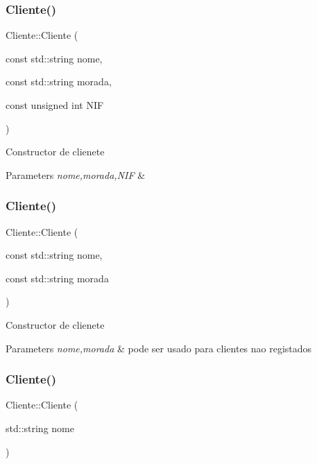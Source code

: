 \subsubsection{\texorpdfstring{Cliente()}{Cliente()}\hspace{0.1cm}{\footnotesize\ttfamily [1/3]}}
{\footnotesize\ttfamily Cliente\+::\+Cliente (\begin{DoxyParamCaption}\item[{const std\+::string}]{nome,  }\item[{const std\+::string}]{morada,  }\item[{const unsigned int}]{N\+IF }\end{DoxyParamCaption})}

Constructor de clienete 
\begin{DoxyParams}{Parameters}
{\em nome,morada,N\+IF} & \\
\hline
\end{DoxyParams}
\hypertarget{class_cliente_a030699a841488d4b3dfbedf75834e002}{}\label{class_cliente_a030699a841488d4b3dfbedf75834e002} 
\subsubsection{\texorpdfstring{Cliente()}{Cliente()}\hspace{0.1cm}{\footnotesize\ttfamily [2/3]}}
{\footnotesize\ttfamily Cliente\+::\+Cliente (\begin{DoxyParamCaption}\item[{const std\+::string}]{nome,  }\item[{const std\+::string}]{morada }\end{DoxyParamCaption})}

Constructor de clienete 
\begin{DoxyParams}{Parameters}
{\em nome,morada} & pode ser usado para clientes nao registados \\
\hline
\end{DoxyParams}
\hypertarget{class_cliente_a17e05e34ce319b738fb68c53e4ded2c3}{}\label{class_cliente_a17e05e34ce319b738fb68c53e4ded2c3} 
\subsubsection{\texorpdfstring{Cliente()}{Cliente()}\hspace{0.1cm}{\footnotesize\ttfamily [3/3]}}
{\footnotesize\ttfamily Cliente\+::\+Cliente (\begin{DoxyParamCaption}\item[{std\+::string}]{nome }\end{DoxyParamCaption})}

